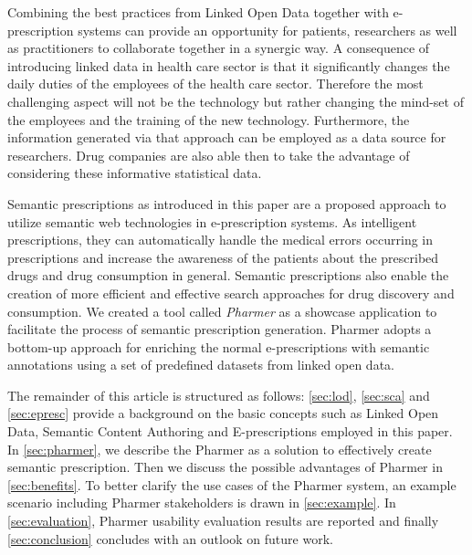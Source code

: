 \documentclass[conference]{IEEEtran}
\begin{document}
Combining the best practices from Linked Open Data together with e-prescription systems can provide an opportunity for patients, researchers as well as practitioners to collaborate together in a synergic way.
A consequence of introducing linked data in health care sector is that it significantly changes the daily duties of the employees of the health care sector.
Therefore the most challenging aspect will not be the technology but rather changing the mind-set of the employees and the training of the new technology\cite{challengesEP}.
Furthermore, the information generated via that approach can be employed as a data source for researchers.
Drug companies are also able then to take the advantage of considering these informative statistical data.

Semantic prescriptions as introduced in this paper are a proposed approach to utilize semantic web technologies in e-prescription systems.
As intelligent prescriptions, they can automatically handle the medical errors occurring in prescriptions and increase the awareness of the patients about the prescribed drugs and drug consumption in general.
Semantic prescriptions also enable the creation of more efficient and effective search approaches for drug discovery and consumption.
We created a tool called \emph{Pharmer} as a showcase application to facilitate the process of semantic prescription generation.
Pharmer adopts a bottom-up approach for enriching the normal e-prescriptions with semantic annotations using a set of predefined datasets from linked open data.

The remainder of this article is structured as follows:
\autoref{sec:lod}, \autoref{sec:sca} and \autoref{sec:epresc} provide a background on the basic concepts such as Linked Open Data, Semantic Content Authoring and E-prescriptions employed in this paper.
In \autoref{sec:pharmer}, we describe the Pharmer as a solution to effectively create semantic prescription.
Then we discuss the possible advantages of Pharmer in \autoref{sec:benefits}.
To better clarify the use cases of the Pharmer system, an example scenario including Pharmer stakeholders is drawn in \autoref{sec:example}.
In \autoref{sec:evaluation}, Pharmer usability evaluation results are reported and finally \autoref{sec:conclusion} concludes with an outlook on future work.
\end{document}

